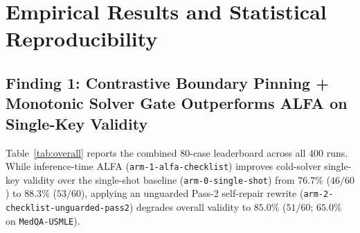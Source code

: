 \documentclass[11pt,a4paper]{article}
\begin{document}
\section{Empirical Results and Statistical Reproducibility}

\begin{table}[t]
\centering
\caption{Combined 80-Case Leaderboard ($400$ Live Generations; Exact $5\times 5$ Cyclic Latin Square $[16,16,16,16,16]$ Overall and $[4,4,4,4,4]$ per Sub-Track). Psychometric columns ($P_{\text{valid}}$, $P_{\text{foil}}$, $D$, Factored $2\times 2$~\%) are evaluated over all $60$ MCQ cases ($300$ MCQ runs; binomial $\text{SE} \approx \pm 3.2\%$); Judge Rubric, Wins, STE Clarity, Repairs/Rollbacks, and Cost cover all $80$ cases ($400$ runs).}
\label{tab:overall}
\small
{}
\end{table}

\subsection{Finding 1: Contrastive Boundary Pinning + Monotonic Solver Gate Outperforms ALFA on Single-Key Validity}
Table~\ref{tab:overall} reports the combined 80-case leaderboard across all $400$ runs. While inference-time ALFA (\texttt{arm-1-alfa-checklist}) improves cold-solver single-key validity over the single-shot baseline (\texttt{arm-0-single-shot}) from $76.7\%$ ($46/60$) to $88.3\%$ ($53/60$), applying an unguarded Pass-2 self-repair rewrite (\texttt{arm-2-checklist-unguarded-pass2}) degrades overall validity to $85.0\%$ ($51/60$; $65.0\%$ on \texttt{MedQA-USMLE}).
\end{document}
